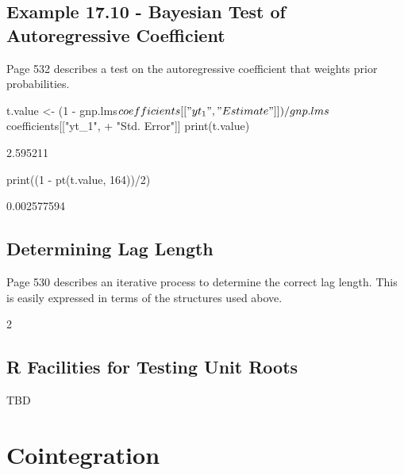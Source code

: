 \documentclass[a4paper]{article}
\begin{document}
\subsection{Example 17.10 - Bayesian Test of Autoregressive Coefficient}
Page 532 describes a test on the autoregressive coefficient that weights prior probabilities.
\begin{Schunk}
\begin{Sinput}
 t.value <- (1 - gnp.lms$coefficients[["yt_1", "Estimate"]])/gnp.lms$coefficients[["yt_1", 
+     "Std. Error"]]
 print(t.value)
\end{Sinput}
\begin{Soutput}
[1] 2.595211
\end{Soutput}
\begin{Sinput}
 print((1 - pt(t.value, 164))/2)
\end{Sinput}
\begin{Soutput}
[1] 0.002577594
\end{Soutput}
\end{Schunk}
\subsection{Determining Lag Length}
Page 530 describes an iterative process to determine the correct lag length.  This is easily expressed
in terms of the structures used above.
\begin{Schunk}
\begin{Soutput}
[1] 2
\end{Soutput}
\end{Schunk}
\subsection{R Facilities for Testing Unit Roots}
TBD

\section{Cointegration}
\end{document}
